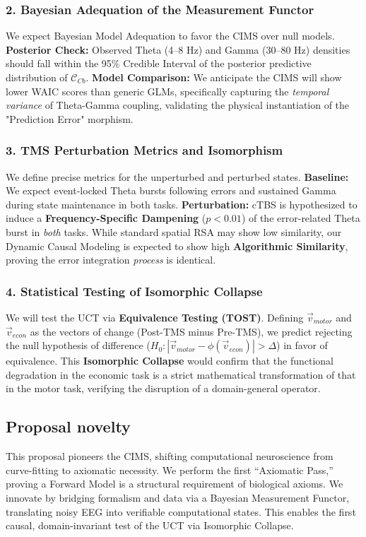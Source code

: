 \documentclass{article}
\begin{document}
	\subsubsection*{2. Bayesian Adequation of the Measurement Functor}
	We expect Bayesian Model Adequation to favor the CIMS over null models. \textbf{Posterior Check:} Observed Theta (4--8 Hz) and Gamma (30--80 Hz) densities should fall within the 95\% Credible Interval of the posterior predictive distribution of $\mathcal{C}_{Cb}$. \textbf{Model Comparison:} We anticipate the CIMS will show lower WAIC scores than generic GLMs, specifically capturing the \textit{temporal variance} of Theta-Gamma coupling, validating the physical instantiation of the "Prediction Error" morphism.
	
	\subsubsection*{3. TMS Perturbation Metrics and Isomorphism}
	We define precise metrics for the unperturbed and perturbed states. \textbf{Baseline:} We expect event-locked Theta bursts following errors and sustained Gamma during state maintenance in both tasks. \textbf{Perturbation:} cTBS is hypothesized to induce a \textbf{Frequency-Specific Dampening} ($p < 0.01$) of the error-related Theta burst in \textit{both} tasks. While standard spatial RSA may show low similarity, our Dynamic Causal Modeling is expected to show high \textbf{Algorithmic Similarity}, proving the error integration \textit{process} is identical.
	
	\subsubsection*{4. Statistical Testing of Isomorphic Collapse}
	We will test the UCT via \textbf{Equivalence Testing (TOST)}. Defining $\vec{v}_{motor}$ and $\vec{v}_{econ}$ as the vectors of change (Post-TMS minus Pre-TMS), we predict rejecting the null hypothesis of difference ($H_0: |\vec{v}_{motor} - \phi(\vec{v}_{econ})| > \Delta$) in favor of equivalence. This \textbf{Isomorphic Collapse} would confirm that the functional degradation in the economic task is a strict mathematical transformation of that in the motor task, verifying the disruption of a domain-general operator.
	
	\subsection{Proposal novelty}
	This proposal pioneers the CIMS, shifting computational neuroscience from curve-fitting to axiomatic necessity. We perform the first ``Axiomatic Pass,'' proving a Forward Model is a structural requirement of biological axioms. We innovate by bridging formalism and data via a Bayesian Measurement Functor, translating noisy EEG into verifiable computational states. This enables the first causal, domain-invariant test of the UCT via Isomorphic Collapse.
	
\end{document}
